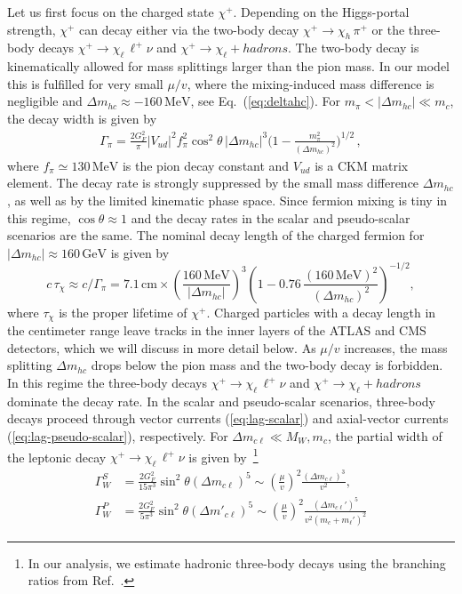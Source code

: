 \documentclass[nofootinbib,prd,aps,superscriptaddress,preprintnumbers]{revtex4}
\def\beq{\begin{equation}}
\def\eeq{\end{equation}}
\begin{document}
Let us first focus on the charged state $\chi^+$. Depending on the Higgs-portal strength, $\chi^+$ can decay either via the two-body decay $\chi^+ \to \chi_h\,\pi^+$ or the three-body decays $\chi^+\to \chi_\ell\,\ell^+\nu$ and $\chi^+\to \chi_\ell+ hadrons$. The two-body decay is kinematically allowed for mass splittings larger than the pion mass. In our model this is fulfilled for very small $\mu/v$, where the mixing-induced mass difference is negligible and $\Delta m_{hc} \approx -160\,\text{MeV}$, see Eq.~(\ref{eq:deltahc}). For $m_\pi < |\Delta m_{hc}| \ll m_c$, the decay width is given by
\begin{align}\label{eq:gammapi}
\Gamma_\pi = \frac{2G_F^2}{\pi} |V_{ud}|^2 f_\pi^2 \cos^2\theta\, |\Delta m_{hc}|^3\Big(1 - \frac{m_\pi^2}{(\Delta m_{hc})^2}\Big)^{1/2}\,,
\end{align}
where  $f_\pi \simeq 130\,\text{MeV}$ is the pion decay constant and $V_{ud}$ is a CKM matrix element. The decay rate is strongly suppressed by the small mass difference $\Delta m_{hc}$, as well as by the limited kinematic phase space. Since fermion mixing is tiny in this regime, $\cos\theta \approx 1$ and the decay rates in the scalar and pseudo-scalar scenarios are the same. The nominal decay length of the charged fermion for $|\Delta m_{hc}| \approx 160\,\text{GeV}$ is given by
\beq\label{eq:chiplus-length}
c\,\tau_{\chi} \approx c/\Gamma_\pi = 7.1\,\text{cm}\times \left(\frac{160\,\text{MeV}}{|\Delta m_{hc}|}\right)^3 \left(1 - 0.76\,\frac{(160\,\text{MeV})^2}{(\Delta m_{hc})^2}\right)^{-1/2},
\eeq
where $\tau_{\chi}$ is the proper lifetime of $\chi^+$. Charged particles with a decay length in the centimeter range leave tracks in the inner layers of the ATLAS and CMS detectors, which we will discuss in more detail below. As $\mu/v$ increases, the mass splitting $\Delta m_{hc}$ drops below the pion mass and the two-body decay is forbidden. In this regime the three-body decays $\chi^+\to \chi_\ell\,\ell^+\nu$ and $\chi^+\to \chi_\ell+ hadrons$ dominate the decay rate. In the scalar and pseudo-scalar scenarios, three-body decays proceed through vector currents (\ref{eq:lag-scalar}) and axial-vector currents (\ref{eq:lag-pseudo-scalar}), respectively. For $\Delta m_{c\ell}\ll M_W,m_c$, the partial width of the leptonic decay $\chi^+\to \chi_\ell\,\ell^+\nu$ is given by~\cite{Djouadi:2001fa}\footnote{In our analysis, we estimate hadronic three-body decays using the branching ratios from Ref.~\cite{Mahbubani:2017gjh}.}
\begin{align}\label{eq:gammaw}
\Gamma_W^S & = \frac{2G_F^2}{15\pi^3}\sin^2\theta(\Delta m_{c\ell})^5 \sim \left(\frac{\mu}{v}\right)^2 \frac{(\Delta m_{c\ell})^3}{v^2},\\\nonumber
\Gamma_W^P & = \frac{2G_F^2}{5\pi^3}\sin^2\theta (\Delta m'_{c\ell})^5 \sim \left(\frac{\mu}{v}\right)^2 \frac{(\Delta m_{c\ell}')^5}{v^2(m_c + m_\ell')^2}
\end{align}
\end{document}
